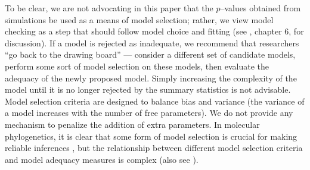 \documentclass[a4paper,12pt]{article}
\begin{document}
To be clear, we are not advocating in this paper that the $p$--values obtained from simulations be used as a means of model selection; rather, we view model checking as a step that should follow model choice and fitting (see \citep{Gelmanbook}, chapter 6, for discussion). If a model is rejected as inadequate, we recommend that researchers ``go back to the drawing board'' --- consider a different set of candidate models, perform some sort of model selection on these models, then evaluate the adequacy of the newly proposed model. Simply increasing the complexity of the model until it is no longer rejected by the summary statistics is not advisable.  Model selection criteria are designed to balance bias and variance (the variance of a model increases with the number of free parameters). We do not provide any mechanism to penalize the addition of extra parameters. In molecular phylogenetics, it is clear that some form of model selection is crucial for making reliable inferences \citep{SullivanJoyce2005, Ripplinger2008}, but the relationship between different model selection criteria and model adequacy measures is complex \citep{Ripplinger2010} (also see \citep{Boettiger2012}). 
\end{document}
